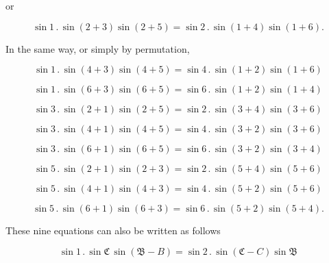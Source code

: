 
or

\begin{equation}
\sin 1 \, . \, \sin(2+3)\sin(2+5) = \sin 2 \, . \, \sin(1+4)\sin(1+6).
\tag{3}
\end{equation}

In the same way, or simply by permutation,

\begin{equation}
\sin 1 \, . \, \sin(4+3)\sin(4+5) = \sin 4 \, . \, \sin(1+2)\sin(1+6)
\tag{4}
\end{equation}

\begin{equation}
\sin 1 \, . \, \sin(6+3)\sin(6+5) = \sin 6 \, . \, \sin(1+2)\sin(1+4)
\tag{5}
\end{equation}

\begin{equation}
\sin 3 \, . \, \sin(2+1)\sin(2+5) = \sin 2 \, . \, \sin(3+4)\sin(3+6)
\tag{6}
\end{equation}

\begin{equation}
\sin 3 \, . \, \sin(4+1)\sin(4+5) = \sin 4 \, . \, \sin(3+2)\sin(3+6)
\tag{7}
\end{equation}

\begin{equation}
\sin 3 \, . \, \sin(6+1)\sin(6+5) = \sin 6 \, . \, \sin(3+2)\sin(3+4)
\tag{8}
\end{equation}

\begin{equation}
\sin 5 \, . \, \sin(2+1)\sin(2+3) = \sin 2 \, . \, \sin(5+4)\sin(5+6)
\tag{9}
\end{equation}

\begin{equation}
\sin 5 \, . \, \sin(4+1)\sin(4+3) = \sin 4 \, . \, \sin(5+2)\sin(5+6)
\tag{10}
\end{equation}

\begin{equation}
\sin 5 \, . \, \sin(6+1)\sin(6+3) = \sin 6 \, . \, \sin(5+2)\sin(5+4).
\tag{11}
\end{equation}

These nine equations can also be written as follows

\begin{equation}
\sin 1 \, . \, \sin\mathfrak{C} \, \sin(\mathfrak{B}-B) = \sin 2 \, . \, \sin(\mathfrak{C}-C)\sin\mathfrak{B}
\tag{3}
\end{equation}

